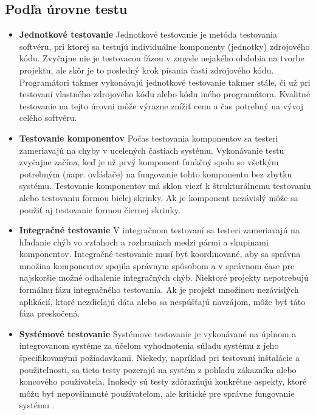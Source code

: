 \documentclass[11pt,twoside,slovak,a4paper]{article}
\begin{document}
	\subsection{Podľa úrovne testu}
	\begin{itemize}
		\item \textbf{Jednotkové testovanie} \newline
			Jednotkové testovanie je metóda testovania softvéru, pri ktorej sa testujú individuálne komponenty (jednotky) zdrojového kódu. Zvyčajne nie je testovacou fázou v zmysle nejakého obdobia na tvorbe projektu, ale skôr je to posledný krok písania časti zdrojového kódu\cite{Alba2008}. Programátori takmer vykonávajú jednotkové testovanie takmer stále, či už pri testovaní vlastného zdrojového kódu alebo kódu iného programátora\cite{Alba2008}. Kvalitné testovanie na tejto úrovni môže výrazne znížiť cenu a čas potrebný na vývoj celého softvéru\cite{EST2002}.
		\item \textbf{Testovanie komponentov} \newline
			Počas testovania komponentov sa testeri zameriavajú na chyby v ucelených častiach systému. Vykonávanie testu zvyčajne začína, keď je už prvý komponent funkčný spolu so všetkým potrebným (napr. ovládače) na fungovanie tohto komponentu bez zbytku systému\cite{Alba2008}.\newline
			Testovanie komponentov má sklon viezť k štrukturálnemu testovaniu alebo testovaniu formou bielej skrinky. Ak je komponent nezávislý môže sa použiť aj testovanie formou čiernej skrinky\cite{Alba2008}.
		\item \textbf{Integračné testovanie} \newline
			V integračnom testovaní sa testeri zameriavajú na hľadanie chýb vo vzťahoch a rozhraniach medzi pármi a skupinami komponentov. Integračné testovanie musí byť koordinované, aby sa správna množina komponentov spojila správnym spôsobom a v správnom čase	pre najskoršie možné odhalenie integračných chýb\cite{Alba2008}.
			Niektoré projekty nepotrebujú formálnu fázu integračného testovania. Ak je projekt množinou nezávislých aplikácií, ktoré nezdieľajú dáta alebo sa nespúšťajú navzájom, môže byť táto fáza preskočená\cite{Alba2008}.
		\item \textbf{Systémové testovanie} \newline		
			Systémove testovanie je vykonávané na úplnom a integrovanom systéme za účelom vyhodnotenia súladu systému z jeho špecifikovanými požiadavkami\cite{Dictionary}. 
			Niekedy, napríklad pri testovaní inštalácie a použiteľnosti, sa tieto testy pozerajú na systém z pohľadu zákazníka alebo koncového používateľa. Inokedy sú testy zdôrazňujú konkrétne aspekty, ktoré môžu byť nepovšimnuté používateľom, ale kritické pre správne fungovanie systému \cite{Alba2008}.

\end{itemize}
\end{document}
